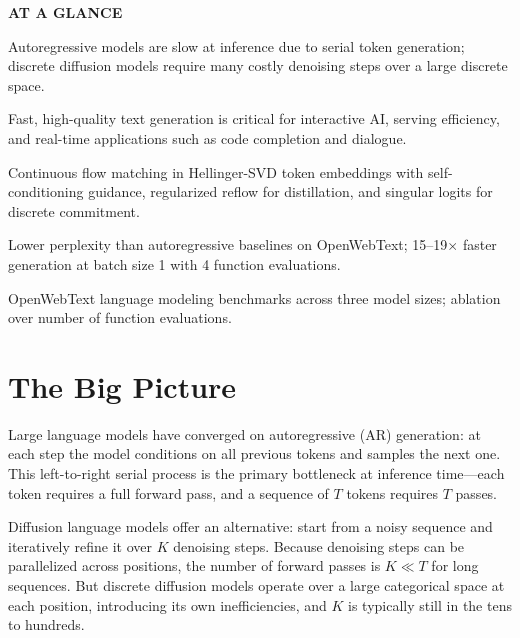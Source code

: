\documentclass[10pt,twocolumn]{article}
\begin{document}
\begin{mdframed}[backgroundcolor=boxgray,linecolor=rulered,linewidth=1pt,
    innerleftmargin=6pt,innerrightmargin=6pt,
    innertopmargin=6pt,innerbottommargin=6pt]
\textbf{\small AT A GLANCE}\par\vspace{4pt}
\begin{description}[leftmargin=0pt,labelsep=4pt,itemsep=2pt,parsep=0pt,
    font=\small\bfseries]
  \item[Problem:] Autoregressive models are slow at inference due to
    serial token generation; discrete diffusion models require many
    costly denoising steps over a large discrete space.
  \item[Why it matters:] Fast, high-quality text generation is
    critical for interactive AI, serving efficiency, and real-time
    applications such as code completion and dialogue.
  \item[Method:] Continuous flow matching in Hellinger-SVD token
    embeddings with self-conditioning guidance, regularized reflow for
    distillation, and singular logits for discrete commitment.
  \item[Result:] Lower perplexity than autoregressive baselines on
    OpenWebText; 15--19$\times$ faster generation at batch size 1
    with 4 function evaluations.
  \item[Evidence:] OpenWebText language modeling benchmarks across
    three model sizes; ablation over number of function evaluations.
\end{description}
\end{mdframed}

\section{The Big Picture}

Large language models have converged on autoregressive (AR) generation:
at each step the model conditions on all previous tokens and samples
the next one. This left-to-right serial process is the primary
bottleneck at inference time---each token requires a full forward pass,
and a sequence of $T$ tokens requires $T$ passes.

Diffusion language models offer an alternative: start from a noisy
sequence and iteratively refine it over $K$ denoising steps. Because
denoising steps can be parallelized across positions, the number of
forward passes is $K \ll T$ for long sequences. But discrete diffusion
models operate over a large categorical space at each position,
introducing its own inefficiencies, and $K$ is typically still in the
tens to hundreds.
\end{document}

